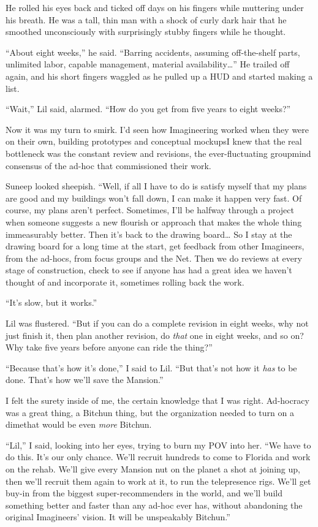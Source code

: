 He rolled his eyes back and ticked off days on his fingers while
muttering under his breath. He was a tall, thin man with a shock of
curly dark hair that he smoothed unconsciously with surprisingly
stubby fingers while he thought.

“About eight weeks,” he said. “Barring accidents, assuming
off-the-shelf parts, unlimited labor, capable management, material
availability…” He trailed off again, and his short fingers waggled
as he pulled up a HUD and started making a list.

“Wait,” Lil said, alarmed. “How do you get from five years to eight
weeks?”

Now it was my turn to smirk. I'd seen how Imagineering worked when
they were on their own, building prototypes and conceptual
mockups{\dash}I knew that the real bottleneck was the constant review and
revisions, the ever-fluctuating groupmind consensus of the ad-hoc
that commissioned their work.

Suneep looked sheepish. “Well, if all I have to do is satisfy
myself that my plans are good and my buildings won't fall down, I
can make it happen very fast. Of course, my plans aren't perfect.
Sometimes, I'll be halfway through a project when someone suggests
a new flourish or approach that makes the whole thing immeasurably
better. Then it's back to the drawing board… So I stay at the
drawing board for a long time at the start, get feedback from other
Imagineers, from the ad-hocs, from focus groups and the Net. Then
we do reviews at every stage of construction, check to see if
anyone has had a great idea we haven't thought of and incorporate
it, sometimes rolling back the work.

“It's slow, but it works.”

Lil was flustered. “But if you can do a complete revision in eight
weeks, why not just finish it, then plan another revision, do
\emph{that} one in eight weeks, and so on? Why take five years
before anyone can ride the thing?”

“Because that's how it's done,” I said to Lil. “But that's not how
it \emph{has} to be done. That's how we'll save the Mansion.”

I felt the surety inside of me, the certain knowledge that I was
right. Ad-hocracy was a great thing, a Bitchun thing, but the
organization needed to turn on a dime{\dash}that would be even
\emph{more} Bitchun.

“Lil,” I said, looking into her eyes, trying to burn my POV into
her. “We have to do this. It's our only chance. We'll recruit
hundreds to come to Florida and work on the rehab. We'll give every
Mansion nut on the planet a shot at joining up, then we'll recruit
them again to work at it, to run the telepresence rigs. We'll get
buy-in from the biggest super-recommenders in the world, and we'll
build something better and faster than any ad-hoc ever has, without
abandoning the original Imagineers' vision. It will be unspeakably
Bitchun.”

